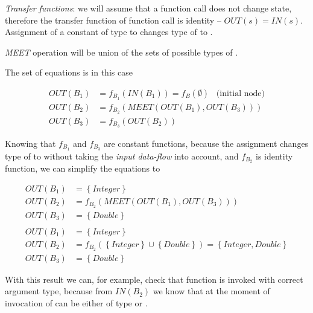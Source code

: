         \emph{Transfer functions}: we will assume that a function call does 
        not change state, therefore the transfer function of 
        function call is identity -- $OUT(s)=IN(s)$. Assignment of 
        a constant  of type  to  changes 
        type of  to .
        
        \emph{MEET} operation will be union of the sets of 
        possible types of .
        
        The set of equations is in this case
        
        \begin{align*}
            OUT(B_1) &= f_{B_1}(IN(B_1))=f_B(\emptyset) \,\,\,\,\,\text{(initial node)} \\
            OUT(B_2) &= f_{B_2}(\mathit{MEET}(OUT(B_1), OUT(B_3))) \\
            OUT(B_3) &= f_{B_3}(OUT(B_2))     
        \end{align*}
        
        Knowing that $f_{B_1}$ and $f_{B_3}$ are constant functions, because 
        the assignment changes type of  to  without taking 
        the \emph{input data-flow} into account, and $f_{B_2}$ is identity 
        function, we can simplify the equations to

        \begin{align*}
            OUT(B_1) &= \left\{ \mathit{Integer} \right\} \\
            OUT(B_2) &= f_{B_2}(\mathit{MEET}(OUT(B_1), OUT(B_3))) \\
            OUT(B_3) &= \left\{ \mathit{Double} \right\} \\
            \\
            OUT(B_1) &= \left\{ \mathit{Integer} \right\} \\
            OUT(B_2) &= f_{B_2}( \left\{ \mathit{Integer} \right\} \cup \left\{ \mathit{Double} \right\} ) = 
                \left\{ \mathit{Integer}, \mathit{Double} \right\} \\
            OUT(B_3) &= \left\{ \mathit{Double} \right\}
        \end{align*}
        
        With this result we can, for example, check that function  
        is invoked with correct argument type, because from $IN(B_2)$ we 
        know that  at the moment of invocation of  
        can be either of type  or .
                
